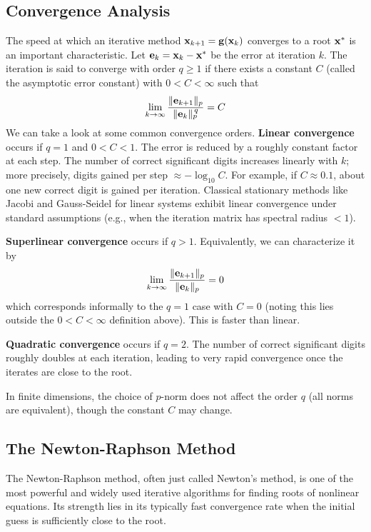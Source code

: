\subsection{Convergence Analysis}
The speed at which an iterative method $\mathbf{x}_{k+1} = \mathbf{g}(\mathbf{x}_k)$ converges to a root $\mathbf{x}^*$ is an important characteristic. Let $\mathbf{e}_k = \mathbf{x}_k - \mathbf{x}^*$ be the error at iteration $k$. The iteration is said to converge with order $q \ge 1$ if there exists a constant $C$ (called the asymptotic error constant) with $0<C<\infty$ such that
\[
    \lim_{k\to\infty} \frac{\|\mathbf{e}_{k+1}\|_p}{\|\mathbf{e}_k\|_p^{\,q}} = C
\]
We can take a look at some common convergence orders. \textbf{Linear convergence} occurs if $q=1$ and $0<C<1$. The error is reduced by a roughly constant factor at each step. The number of correct significant digits increases linearly with $k$; more precisely, digits gained per step $\approx -\log_{10} C$. For example, if $C \approx 0.1$, about one new correct digit is gained per iteration. Classical stationary methods like Jacobi and Gauss-Seidel for linear systems exhibit linear convergence under standard assumptions (e.g., when the iteration matrix has spectral radius $<1$).

\textbf{Superlinear convergence} occurs if $q>1$. Equivalently, we can characterize it by
\[
  \lim_{k\to\infty}\frac{\|\mathbf{e}_{k+1}\|_p}{\|\mathbf{e}_k\|_p}=0
\]
which corresponds informally to the $q=1$ case with $C=0$ (noting this lies outside the $0<C<\infty$ definition above). This is faster than linear.

\textbf{Quadratic convergence} occurs if $q=2$. The number of correct significant digits roughly doubles at each iteration, leading to very rapid convergence once the iterates are close to the root.

In finite dimensions, the choice of $p$-norm does not affect the order $q$ (all norms are equivalent), though the constant $C$ may change.



\subsection{The Newton-Raphson Method}
The Newton-Raphson method, often just called Newton's method, is one of the most powerful and widely used iterative algorithms for finding roots of nonlinear equations. Its strength lies in its typically fast convergence rate when the initial guess is sufficiently close to the root.


